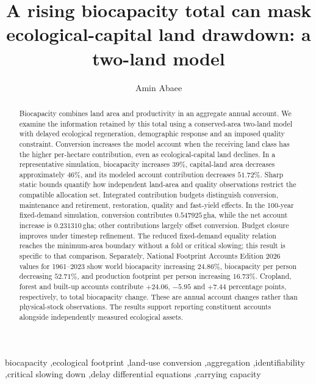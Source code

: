 \documentclass[preprint,12pt,authoryear]{elsarticle}
\begin{document}
\begin{frontmatter}

\title{A rising biocapacity total can mask ecological-capital land drawdown: a two-land model}

\author[1]{\texorpdfstring{Amin Abaee}{Amin Abaee}}

\begin{abstract}
Biocapacity combines land area and productivity in an aggregate annual account. We examine the information retained by this total using a conserved-area two-land model with delayed ecological regeneration, demographic response and an imposed quality constraint. Conversion increases the model account when the receiving land class has the higher per-hectare contribution, even as ecological-capital land declines. In a representative simulation, biocapacity increases $39\%$, capital-land area decreases approximately $46\%$, and its modeled account contribution decreases $51.72\%$. Sharp static bounds quantify how independent land-area and quality observations restrict the compatible allocation set. Integrated contribution budgets distinguish conversion, maintenance and retirement, restoration, quality and fast-yield effects. In the 100-year fixed-demand simulation, conversion contributes $0.547925$\,gha, while the net account increase is $0.231310$\,gha; other contributions largely offset conversion. Budget closure improves under timestep refinement. The reduced fixed-demand equality relation reaches the minimum-area boundary without a fold or critical slowing; this result is specific to that comparison. Separately, National Footprint Accounts Edition 2026 values for 1961--2023 show world biocapacity increasing $24.86\%$, biocapacity per person decreasing $52.71\%$, and production footprint per person increasing $16.73\%$. Cropland, forest and built-up accounts contribute $+24.06$, $-5.95$ and $+7.44$ percentage points, respectively, to total biocapacity change. These are annual account changes rather than physical-stock observations. The results support reporting constituent accounts alongside independently measured ecological assets.

\end{abstract}

\begin{keyword}
\footnotesize
biocapacity \sep ecological footprint \sep land-use conversion \sep aggregation \sep identifiability \sep critical slowing down \sep delay differential equations \sep carrying capacity
\end{keyword}

\end{frontmatter}
\end{document}
